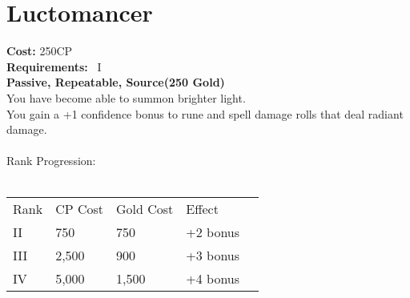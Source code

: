 \section{Luctomancer}\label{perk:luctomancer}
\textbf{Cost:} 250CP\\
\textbf{Requirements:}~ I\\
\textbf{Passive, Repeatable, Source(250 Gold)}\\
You have become able to summon brighter light.\\
You gain a +1 confidence bonus to rune and spell damage rolls that deal radiant damage.\\
\\
Rank Progression:\\
\\
\begin{tabular}{l | l | l | l | l}
    Rank & CP Cost & Gold Cost &  Effect\\
    II & 750 & 750 & +2 bonus\\
    III & 2,500 & 900 & +3 bonus\\
    IV & 5,000 & 1,500 & +4 bonus\\
\end{tabular}